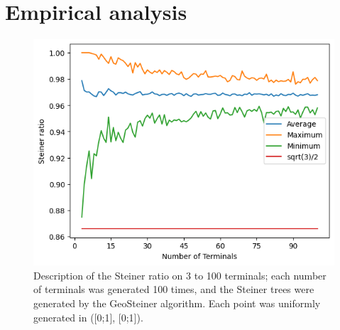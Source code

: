 \documentclass{mpaper}
\begin{document}

\section{Empirical analysis} \label{sec:ea}

\begin{figure}
  \begin{center}
  \includegraphics[scale=0.5]{plot2.png}
  \end{center}
  \caption{\label{fig:1}Description of the Steiner ratio on 3 to 100 terminals; each number of terminals was generated 100 times, and the Steiner trees were generated by the GeoSteiner algorithm. Each point was uniformly generated in ([0;1], [0;1]). }
\end{figure}
\end{document}
